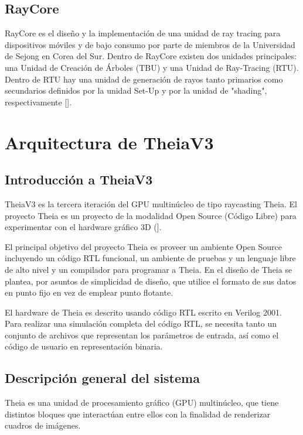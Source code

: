 \subsection{RayCore}

RayCore es el diseño y la implementación de una unidad de ray tracing para dispositivos móviles y de bajo consumo por parte de miembros de la Universidad de Sejong en Corea del Sur. Dentro de RayCore existen dos unidades principales: una Unidad de Creación de Árboles (TBU) y una Unidad de Ray-Tracing (RTU). Dentro de RTU hay una unidad de generación de rayos tanto primarios como secundarios definidos por la unidad Set-Up y por la unidad de "shading", respectivamente [\cite{Nah2014}].   


\section{Arquitectura de TheiaV3}
\subsection{Introducción a TheiaV3}
TheiaV3 es la tercera iteración del GPU multinúcleo de tipo raycasting Theia. El proyecto Theia es un proyecto de la modalidad Open Source (Código Libre) para experimentar con el hardware gráfico 3D (\cite{Valverde}].

El principal objetivo del proyecto Theia es proveer un ambiente Open Source incluyendo un código RTL funcional, un ambiente de pruebas y un lenguaje libre de alto nivel y un compilador para programar a Theia. En el diseño de Theia se plantea, por asuntos de simplicidad de diseño, que utilice el formato de sus datos en punto fijo en vez de emplear punto flotante.

El hardware de Theia es descrito usando código RTL escrito en Verilog 2001. Para realizar una simulación completa del código RTL, se necesita tanto un conjunto de archivos que representan los parámetros de entrada, así como el código de usuario en representación binaria.  

\subsection{Descripción general del sistema}

Theia es una unidad de procesamiento gráfico (GPU) multinúcleo, que tiene distintos bloques que interactúan entre ellos con la finalidad de renderizar cuadros de imágenes.

